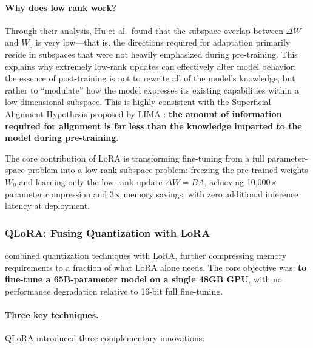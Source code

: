 \paragraph{Why does low rank work?}
Through their analysis, Hu et al.\ found that
the subspace overlap between $\Delta W$ and $W_0$ is very low---that is, the directions required for adaptation primarily reside in subspaces that were not heavily emphasized during pre-training.
This explains why extremely low-rank updates can effectively alter model behavior:
the essence of post-training is not to rewrite all of the model's knowledge,
but rather to ``modulate'' how the model expresses its existing capabilities within a low-dimensional subspace.
This is highly consistent with the Superficial Alignment Hypothesis proposed by LIMA \cite{zhou2023lima}:
\textbf{the amount of information required for alignment is far less than the knowledge imparted to the model during pre-training}.

\begin{solutionbox}
The core contribution of LoRA is transforming fine-tuning from a full parameter-space problem into a low-rank subspace problem:
freezing the pre-trained weights $W_0$ and learning only the low-rank update $\Delta W = BA$,
achieving 10,000$\times$ parameter compression and 3$\times$ memory savings,
with zero additional inference latency at deployment.
\end{solutionbox}

\subsubsection{QLoRA: Fusing Quantization with LoRA}
\label{sec:t7-qlora}

 combined quantization techniques with LoRA,
further compressing memory requirements to a fraction of what LoRA alone needs.
The core objective was: \textbf{to fine-tune a 65B-parameter model on a single 48GB GPU},
with no performance degradation relative to 16-bit full fine-tuning.

\paragraph{Three key techniques.}
QLoRA introduced three complementary innovations:


